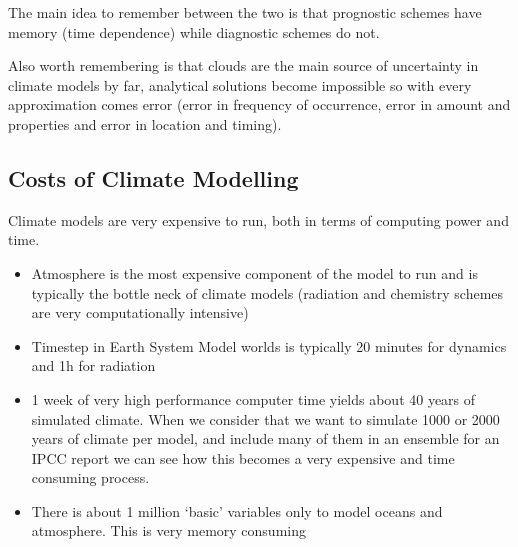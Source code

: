 \noindent The main idea to remember between the two is that prognostic schemes
have memory (time dependence) while diagnostic schemes do not.

Also worth remembering is that clouds are the main source of uncertainty in climate
models by far, analytical solutions become impossible so with every approximation
comes error (error in frequency of occurrence, error in amount and properties and
error in location and timing).

\subsection{Costs of Climate Modelling}
\label{sec:costs-climate-modelling}

Climate models are very expensive to run, both in terms of computing power and
time.
\begin{itemize}
    \item Atmosphere is the most expensive component of the model to run and is
    typically the bottle neck of climate models (radiation and chemistry schemes
    are very computationally intensive)
    \item Timestep in Earth System Model worlds is typically 20 minutes for
    dynamics and 1h for radiation
    \item 1 week of very high performance computer time yields about 40 years of
    simulated climate. When we consider that we want to simulate 1000 or 2000 years
    of climate per model, and include many of them in an ensemble for an IPCC report
    we can see how this becomes a very expensive and time consuming process.
    \item There is about 1 million `basic' variables only to model oceans and
    atmosphere. This is very memory consuming
\end{itemize}

